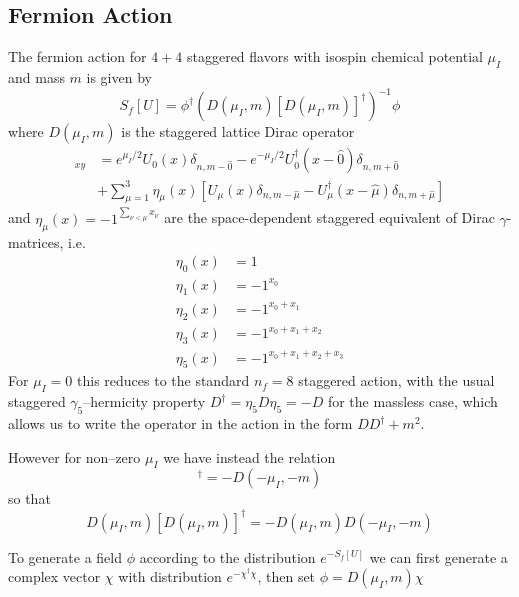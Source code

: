 \documentclass[a4paper,12pt]{article}
\begin{document}
\subsection{Fermion Action}
The fermion action for $4+4$ staggered flavors with isospin chemical potential $\mu_I$ and mass $m$ is given by
\begin{equation}
\label{eq:action_fermion}
 S_f[U] = \phi^{\dagger} (D(\mu_I,m) [D(\mu_I,m)]^{\dagger})^{-1} \phi
\end{equation}
where $D(\mu_I,m)$ is the staggered lattice Dirac operator
\begin{align}
 [D(\mu_I,m)]_{xy} &= e^{\mu_I/2} U_{0}(x) \delta_{n,m-\hat0} - e^{-\mu_I/2} U_{0}^{\dagger}(x-\hat0) \delta_{n,m+\hat0} \\
 &+ \sum_{\mu=1}^{3} \eta_{\mu}(x) \left[ U_{\mu}(x) \delta_{n,m-\hat\mu} - U_{\mu}^{\dagger}(x-\hat\mu) \delta_{n,m+\hat\mu} \right]
\end{align}
and $\eta_{\mu}(x) = -1^{\sum_{\nu<\mu}x_{\nu}}$ are the space-dependent staggered equivalent of Dirac $\gamma$-matrices, i.e.
\begin{align}
 \eta_{0}(x) &= 1 \\
 \eta_{1}(x) &= -1^{x_0} \\
 \eta_{2}(x) &= -1^{x_0+x_1} \\
 \eta_{3}(x) &= -1^{x_0+x_1+x_2} \\
 \eta_{5}(x) &= -1^{x_0+x_1+x_2+x_3}
\end{align}
For $\mu_I=0$ this reduces to the standard $n_f=8$ staggered action, with the usual staggered $\gamma_5$--hermicity property $D^{\dagger} = \eta_5 D \eta_5 = -D$ for the massless case, 
which allows us to write the operator in the action in the form $DD^{\dagger} + m^2$.

However for non--zero $\mu_I$ we have instead the relation
\begin{equation}
 [D(\mu_I,m)]^{\dagger} = - D(-\mu_I,-m)
\end{equation}
so that
\begin{equation}
 D(\mu_I,m) [D(\mu_I,m)]^{\dagger} = -D(\mu_I,m) D(-\mu_I,-m)
\end{equation}

To generate a field $\phi$ according to the distribution $e^{-S_f[U]}$ we 
can first generate a complex vector $\chi$ with distribution $e^{-\chi^{\dagger}\chi}$, then set $\phi = D(\mu_I,m)\chi$
\end{document}
